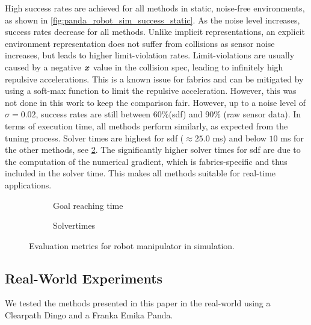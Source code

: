 High success rates are achieved for all methods in static,
noise-free environments, as shown in \cref{fig:panda_robot_sim_success_static}.
As the noise level increases, success rates decrease for all
methods. Unlike implicit representations, an explicit environment
representation does not suffer from collisions as sensor
noise increases, but leads to higher limit-violation rates. 
Limit-violations are usually caused by a negative $\bm{x}$ value
in the collision spec, leading to infinitely high repulsive
accelerations. 
This is a known issue for \ac{fabrics} and can be
mitigated by using a soft-max function to limit the
repulsive acceleration. However, this was not done in this
work to keep the comparison fair.
However, up to a noise level of
$\sigma=0.02$, success rates are still between
60\%(\ac{sdf}) and 90\% (raw sensor data). In terms of
execution time, all methods perform similarly, as expected
from the tuning process. Solver times are highest for
\ac{sdf} ($\approx 25.0$ ms) and below $10$ ms for the 
other methods, see \cref{subfig:panda_sim_solvertimes}.
The significantly higher solver times for \ac{sdf} are due
to the computation of the numerical gradient, which is
\ac{fabrics}-specific and thus included in the solver time.
This makes all methods suitable for real-time applications.
%
\begin{figure}[ht]
  \centering
  \begin{subfigure}{0.5\linewidth}
    \centering
    
    \caption{Goal reaching time}%
    \label{subfig:panda_sim_time2Goal}
  \end{subfigure}%
  \begin{subfigure}{0.5\linewidth}
    \centering
    
    \caption{Solvertimes}%
    \label{subfig:panda_sim_solvertimes}
  \end{subfigure}%
  \caption{Evaluation metrics for robot manipulator in
    simulation.
  }%
  \label{fig:panda_sim_metrics}
\end{figure}

\subsection{Real-World Experiments} %
\label{sub:real_world_experiments}
%
We tested the methods presented in this paper in the
real-world using a Clearpath Dingo and a Franka
Emika Panda. 

